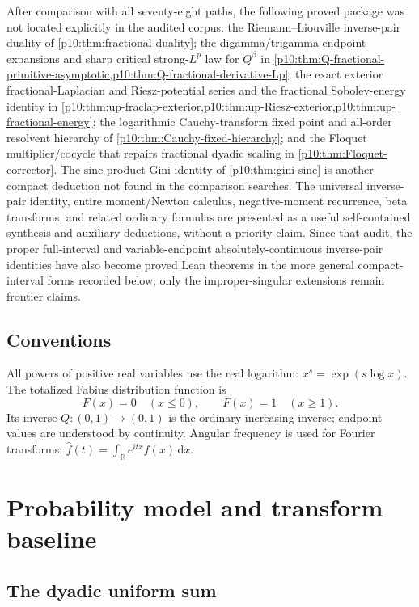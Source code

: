 \documentclass[11pt,oneside]{article}
\theoremstyle{definition}
\theoremstyle{remark}
\newcommand{\F}{F}
\newcommand{\Q}{Q}
\newcommand{\R}{\mathbb R}
\newcommand{\dd}{\,\mathrm d}
\newcommand{\1}{\mathbf 1}
\begin{document}
\begin{resultbox}
After comparison with all seventy-eight paths, the following proved package was not located
explicitly in the audited corpus: the Riemann--Liouville inverse-pair duality of
\cref{p10:thm:fractional-duality}; the digamma/trigamma endpoint expansions and sharp critical
strong-\(L^p\) law for \(\Q^\beta\) in
\cref{p10:thm:Q-fractional-primitive-asymptotic,p10:thm:Q-fractional-derivative-Lp}; the exact
exterior fractional-Laplacian and Riesz-potential series and the fractional Sobolev-energy
identity in \cref{p10:thm:up-fraclap-exterior,p10:thm:up-Riesz-exterior,p10:thm:up-fractional-energy};
the logarithmic Cauchy-transform fixed point and all-order resolvent hierarchy of
\cref{p10:thm:Cauchy-fixed-hierarchy}; and the Floquet multiplier/cocycle that repairs
fractional dyadic scaling in \cref{p10:thm:Floquet-corrector}.  The sinc-product Gini identity
of \cref{p10:thm:gini-sinc} is another compact deduction not found in the comparison searches.
The universal inverse-pair identity, entire moment/Newton calculus, negative-moment
recurrence, beta transforms, and related ordinary formulas are presented as a useful
self-contained synthesis and auxiliary deductions, without a priority claim.
Since that audit, the proper full-interval and variable-endpoint absolutely-continuous
inverse-pair identities have also become proved Lean theorems in the more general
compact-interval forms recorded below; only the improper-singular extensions remain
frontier claims.
\end{resultbox}

\subsection{Conventions}

All powers of positive real variables use the real logarithm:
\(x^s=\exp(s\log x)\).  The totalized Fabius distribution function is
\[
 \F(x)=0\quad(x\le0),\qquad \F(x)=1\quad(x\ge1).
\]
Its inverse \(\Q:(0,1)\to(0,1)\) is the ordinary increasing inverse; endpoint values
are understood by continuity.  Angular frequency is used for Fourier transforms:
\(\widehat f(t)=\int_\R e^{itx}f(x)\dd x\).

\section{Probability model and transform baseline}

\subsection{The dyadic uniform sum}
\end{document}
